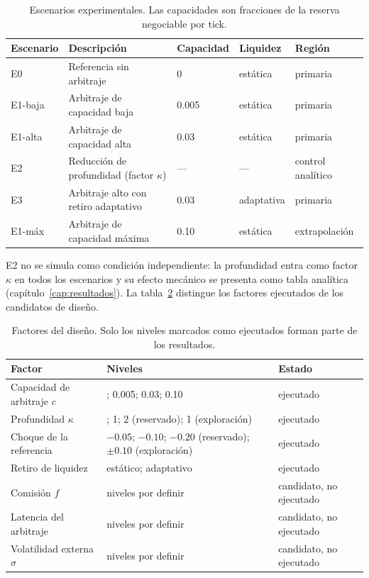 \begin{table}[htbp]
\centering
\caption{Escenarios experimentales. Las capacidades son fracciones de la reserva negociable por tick.}
\label{tab:escenarios}
\small
\begin{tabularx}{\textwidth}{@{}l >{\raggedright\arraybackslash}X l l l@{}}
\toprule
Escenario & Descripción & Capacidad & Liquidez & Región \\
\midrule
E0 & Referencia sin arbitraje & 0 & estática & primaria \\
E1-baja & Arbitraje de capacidad baja & 0.005 & estática & primaria \\
E1-alta & Arbitraje de capacidad alta & 0.03 & estática & primaria \\
E2 & Reducción de profundidad (factor $\kappa$) & --- & --- & control analítico \\
E3 & Arbitraje alto con retiro adaptativo & 0.03 & adaptativa & primaria \\
E1-máx & Arbitraje de capacidad máxima & 0.10 & estática & extrapolación \\
\bottomrule
\end{tabularx}
\end{table}

E2 no se simula como condición independiente: la profundidad entra como factor $\kappa$ en todos los escenarios y su efecto mecánico se presenta como tabla analítica (capítulo~\ref{cap:resultados}). La tabla~\ref{tab:factores} distingue los factores ejecutados de los candidatos de diseño.

\begin{table}[htbp]
\centering
\caption{Factores del diseño. Solo los niveles marcados como ejecutados forman parte de los resultados.}
\label{tab:factores}
\scriptsize
\setlength{\tabcolsep}{3pt}
\renewcommand{\arraystretch}{0.9}
\begin{tabularx}{\textwidth}{@{}>{\raggedright\arraybackslash}p{} >{\raggedright\arraybackslash}X >{\raggedright\arraybackslash}p{}@{}}
\toprule
Factor & Niveles & Estado \\
\midrule
Capacidad de arbitraje $c$ & 0; 0.005; 0.03; 0.10 & ejecutado \\
Profundidad $\kappa$ & 0.5; 1; 2 (reservado); 1 (exploración) & ejecutado \\
Choque de la referencia & $-0.05$; $-0.10$; $-0.20$ (reservado); $\pm0.10$ (exploración) & ejecutado \\
Retiro de liquidez & estático; adaptativo & ejecutado \\
Comisión $f$ & niveles por definir & candidato, no ejecutado \\
Latencia del arbitraje & niveles por definir & candidato, no ejecutado \\
Volatilidad externa $\sigma$ & niveles por definir & candidato, no ejecutado \\
\bottomrule
\end{tabularx}
\end{table}

